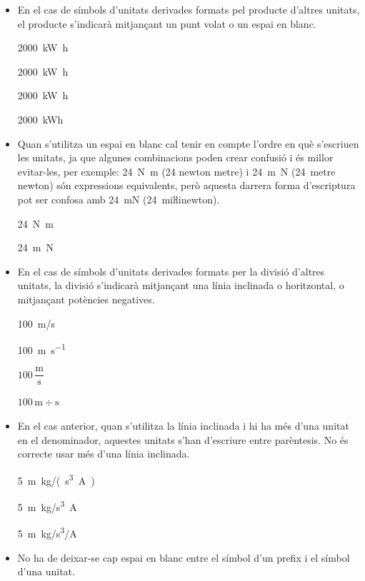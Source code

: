 \begin{itemize}
\item En el cas de símbols d'unitats derivades formats pel producte
d'altres unitats, el producte s'indicarà mitjançant un punt volat o
un espai en blanc.

\textcolor{Green}\faCheckSquare{} \qty[inter-unit-product=\cdot]{2000}{kW.h}

\textcolor{Green}\faCheckSquare{} \qty{2000}{kW.h}

\textcolor{Red}\faTimesCircle{} \qty[inter-unit-product=-]{2000}{kW.h}

\textcolor{Red}\faTimesCircle{} \qty{2000}{kWh}

\item Quan s'utilitza un espai en blanc cal tenir en compte  l'ordre en què s'escriuen
les unitats, ja que algunes combinacions poden crear confusió i
és millor evitar-les, per exemple: \qty{24}{N.m} (24 newton metre) i
\qty{24}{m.N} (24~metre newton) són expressions equivalents, però
aquesta darrera forma d'escriptura pot ser confosa amb \qty{24}{mN} (24~miŀlinewton).

\textcolor{Green}\faCheckSquare{}  \qty{24}{N.m}

\textcolor{Blue}\faExclamationTriangle{} \qty{24}{m.N}

\item En el cas de símbols d'unitats derivades formats per la divisió
d'altres unitats, la divisió s'indicarà mitjançant una línia
inclinada o horitzontal, o mitjançant potències negatives.

\textcolor{Green}\faCheckSquare{} \qty{100}{m/s}

\textcolor{Green}\faCheckSquare{} \qty{100}{m.s^{-1}}

\textcolor{Green}\faCheckSquare{} $100\,\dfrac{\text{m}}{\text{s}}$

\textcolor{Red}\faTimesCircle{} $100\,\text{m}\div\text{s}$


\item En el cas anterior, quan s'utilitza la línia inclinada i hi ha més
d'una unitat en el denominador, aquestes unitats s'han d'escriure
entre parèntesis. No és correcte usar més d'una línia inclinada.

\textcolor{Green}\faCheckSquare{} \qty{5}{m.kg/(s^3.A)}

\textcolor{Red}\faTimesCircle{} \qty{5}{m.kg/s^3.A}

\textcolor{Red}\faTimesCircle{} \qty{5}{m.kg/s^3/A}


\item No ha de deixar-se cap espai en blanc entre el símbol d'un prefix i
el símbol d'una unitat.


\end{itemize}
